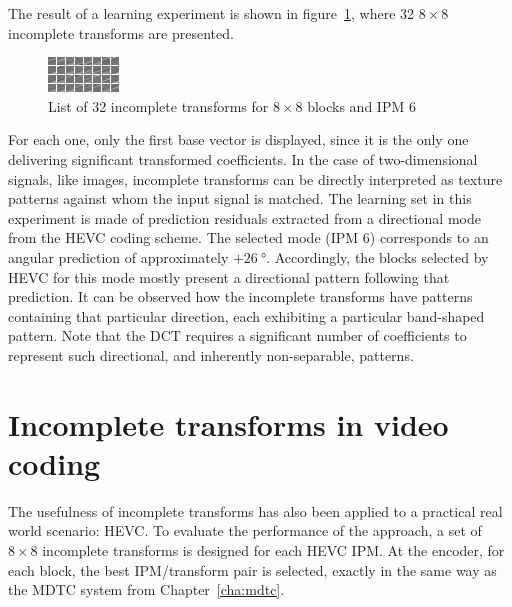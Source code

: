 \documentclass[11pt,a4paper,openright,twoside]{book}
\numberwithin{equation}{section} %
\numberwithin{figure}{section} %
\numberwithin{table}{section} %
\begin{document}
The result of a learning experiment is shown in
figure~\ref{fig:it_32_transforms}, where 32 $8\times8$ incomplete transforms
are presented.
\begin{figure}[tp]
	\centering
	\includegraphics[width=0.8\linewidth]{./figures/it_32_transforms.png}
	\caption{List of 32 incomplete transforms for $8\times8$ blocks and
	\acs{IPM} 6}
	\label{fig:it_32_transforms}
\end{figure}
For each one, only the first base vector is displayed, since it is the only
one delivering significant transformed coefficients.
In the case of two-dimensional signals, like images, incomplete transforms can
be directly interpreted as texture patterns against whom the input signal is
matched.
The learning set in this experiment is made of prediction residuals extracted
from a directional mode from the \ac{HEVC} coding scheme.
The selected mode (\ac{IPM} 6) corresponds to an angular prediction of
approximately $+\SI{26}{\degree}$.
Accordingly, the blocks selected by \ac{HEVC} for this mode mostly present a
directional pattern following that prediction.
It can be observed how the incomplete transforms have patterns containing that
particular direction, each exhibiting a particular band-shaped pattern.
Note that the \ac{DCT} requires a significant number of coefficients to
represent such directional, and inherently non-separable, patterns.

\section{Incomplete transforms in video coding}
\label{sec:it_video_coding}

The usefulness of incomplete transforms has also been applied to a practical
real world scenario: \ac{HEVC}.
To evaluate the performance of the approach, a set of $8\times8$ incomplete
transforms is designed for each \ac{HEVC} \ac{IPM}.
At the encoder, for each block, the best \ac{IPM}/transform pair is selected,
exactly in the same way as the \ac{MDTC} system from Chapter~\ref{cha:mdtc}.
\end{document}
